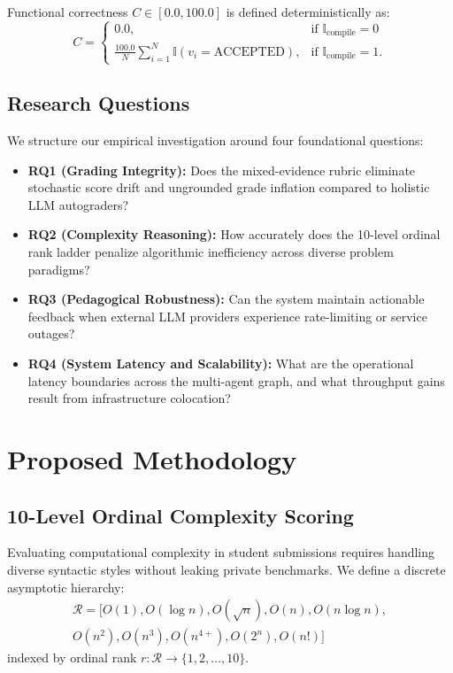 \documentclass[conference]{IEEEtran}
\begin{document}
Functional correctness $C \in [0.0, 100.0]$ is defined deterministically as:
\begin{equation}
C = \begin{cases} 
0.0, & \text{if } \mathbb{I}_{\text{compile}} = 0 \\
\displaystyle \frac{100.0}{N} \sum_{i=1}^N \mathbb{I}(v_i = \text{ACCEPTED}), & \text{if } \mathbb{I}_{\text{compile}} = 1.
\end{cases}
\label{eq:correctness}
\end{equation}

\subsection{Research Questions}
We structure our empirical investigation around four foundational questions:
\begin{itemize}
    \item \textbf{RQ1 (Grading Integrity):} Does the mixed-evidence rubric eliminate stochastic score drift and ungrounded grade inflation compared to holistic LLM autograders?
    \item \textbf{RQ2 (Complexity Reasoning):} How accurately does the 10-level ordinal rank ladder penalize algorithmic inefficiency across diverse problem paradigms?
    \item \textbf{RQ3 (Pedagogical Robustness):} Can the system maintain actionable feedback when external LLM providers experience rate-limiting or service outages?
    \item \textbf{RQ4 (System Latency and Scalability):} What are the operational latency boundaries across the multi-agent graph, and what throughput gains result from infrastructure colocation?
\end{itemize}

\section{Proposed Methodology}

\subsection{10-Level Ordinal Complexity Scoring}
Evaluating computational complexity in student submissions requires handling diverse syntactic styles without leaking private benchmarks. We define a discrete asymptotic hierarchy:
\begin{multline}
\mathcal{R} = \big[ O(1), O(\log n), O(\sqrt{n}), O(n), O(n \log n), \\
O(n^2), O(n^3), O(n^{4+}), O(2^n), O(n!) \big]
\end{multline}
indexed by ordinal rank $r: \mathcal{R} \to \{1, 2, \dots, 10\}$.
\end{document}
